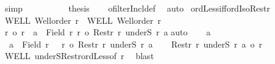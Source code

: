 \begin{isabellebody}
\ simp\isanewline
\ \ \isanewline
\ \ \isamarkupfalse%
\ {}\ {}\ \isamarkupfalse%
\ {\isacharquery}{\kern0pt}thesis\isanewline
\ \ \isamarkupfalse%
\ ofilterIncl{\isacharunderscore}{\kern0pt}def\ \isamarkupfalse%
\ auto\isanewline
{}\isamarkupfalse%
%
\endisatagproof
{\isafoldproof}%
%
\isadelimproof
\isanewline
%
\endisadelimproof
\isanewline
{}\isamarkupfalse%
\ ordLess{\isacharunderscore}{\kern0pt}iff{\isacharunderscore}{\kern0pt}ordIso{\isacharunderscore}{\kern0pt}Restr{\isacharcolon}{\kern0pt}\isanewline
{}\ WELL{\isacharcolon}{\kern0pt}\ {\isachardoublequoteopen}Well{\isacharunderscore}{\kern0pt}order\ r{\isachardoublequoteclose}\ \ WELL{\isacharprime}{\kern0pt}{\isacharcolon}{\kern0pt}\ {\isachardoublequoteopen}Well{\isacharunderscore}{\kern0pt}order\ r{\isacharprime}{\kern0pt}{\isachardoublequoteclose}\isanewline
{}\ {\isachardoublequoteopen}{\isacharparenleft}{\kern0pt}r{\isacharprime}{\kern0pt}\ {\isacharless}{\kern0pt}o\ r{\isacharparenright}{\kern0pt}\ {\isacharequal}{\kern0pt}\ {\isacharparenleft}{\kern0pt}{\isasymexists}a\ {\isasymin}\ Field\ r{\isachardot}{\kern0pt}\ r{\isacharprime}{\kern0pt}\ {\isacharequal}{\kern0pt}o\ Restr\ r\ {\isacharparenleft}{\kern0pt}underS\ r\ a{\isacharparenright}{\kern0pt}{\isacharparenright}{\kern0pt}{\isachardoublequoteclose}\isanewline
%
\isadelimproof
%
\endisadelimproof
%
\isatagproof
{}\isamarkupfalse%
{\isacharparenleft}{\kern0pt}auto{\isacharparenright}{\kern0pt}\isanewline
\ \ \isamarkupfalse%
\ a\ \isamarkupfalse%
\ {\isacharasterisk}{\kern0pt}{\isacharcolon}{\kern0pt}\ {\isachardoublequoteopen}a\ {\isasymin}\ Field\ r{\isachardoublequoteclose}\ \ {\isacharasterisk}{\kern0pt}{\isacharasterisk}{\kern0pt}{\isacharcolon}{\kern0pt}\ {\isachardoublequoteopen}r{\isacharprime}{\kern0pt}\ {\isacharequal}{\kern0pt}o\ Restr\ r\ {\isacharparenleft}{\kern0pt}underS\ r\ a{\isacharparenright}{\kern0pt}{\isachardoublequoteclose}\isanewline
\ \ \isamarkupfalse%
\ {\isachardoublequoteopen}Restr\ r\ {\isacharparenleft}{\kern0pt}underS\ r\ a{\isacharparenright}{\kern0pt}\ {\isacharless}{\kern0pt}o\ r{\isachardoublequoteclose}\ \isamarkupfalse%
\ WELL\ underS{\isacharunderscore}{\kern0pt}Restr{\isacharunderscore}{\kern0pt}ordLess{\isacharbrackleft}{\kern0pt}of\ r{\isacharbrackright}{\kern0pt}\ \isamarkupfalse%
\ blast\isanewline
\ \ \isamarkupfalse%

\end{isabellebody}
